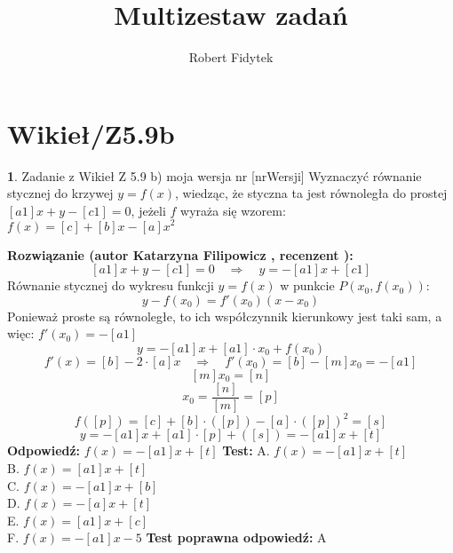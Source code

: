\documentclass[12pt, a4paper]{article}
\title{Multizestaw zadań}
\author{Robert Fidytek}
\date{}
\theoremstyle{definition} %
\newtheorem{zad}{}
\newcommand{\kategoria}[1]{\section{#1}} %
\newcommand{\zadStart}[1]{\begin{zad}#1\newline} %
\newcommand{\zadStop}{\end{zad}}   %
\newcommand{\rozwStart}[2]{\noindent \textbf{Rozwiązanie (autor #1 , recenzent #2): }\newline} %
\newcommand{\rozwStop}{\newline}                                            %
\newcommand{\odpStart}{\noindent \textbf{Odpowiedź:}\newline}    %
\newcommand{\odpStop}{\newline}                                             %
\newcommand{\testStart}{\noindent \textbf{Test:}\newline} %
\newcommand{\testStop}{\newline} %
\newcommand{\kluczStart}{\noindent \textbf{Test poprawna odpowiedź:}\newline} %
\newcommand{\kluczStop}{\newline} %
\begin{document}
\maketitle


\kategoria{Wikieł/Z5.9b}
\zadStart{Zadanie z Wikieł Z 5.9 b) moja wersja nr [nrWersji]}
Wyznaczyć równanie stycznej do krzywej $y=f(x)$, wiedząc, że styczna ta jest równoległa do prostej $[a1]x+y-[c1]=0$, jeżeli $f$ wyraża się wzorem:\\
$f(x)=[c] +[b]x-[a]x^2$
\zadStop
\rozwStart{Katarzyna Filipowicz}{}
$$
[a1]x+y-[c1]=0 \quad \Rightarrow \quad y=-[a1]x+[c1]
$$
Równanie stycznej do wykresu funkcji $y=f(x)$ w punkcie $P(x_0,f(x_0))$:
$$
y-f(x_0)=f'(x_0)(x-x_0)
$$
Ponieważ proste są równoległe, to ich współczynnik kierunkowy jest taki sam, a więc: $f'(x_0)=-[a1]$
$$
y=-[a1]x+[a1]\cdot x_0+f(x_0)
$$ $$
f'(x)=[b]-2\cdot [a]x \quad \Rightarrow \quad f'(x_0)=[b]-[m]x_0=-[a1]
$$ $$
[m]x_0=[n]
$$ $$
x_0=\frac{[n]}{[m]}=[p]
$$ $$
f([p])=[c]+[b]\cdot([p])-[a]\cdot([p])^2=[s]
$$ $$
y=-[a1]x+[a1]\cdot[p]+([s])=-[a1]x +[t]
$$
\rozwStop
\odpStart
$f(x)=-[a1]x+ [t]$
\odpStop
\testStart
A. $f(x)=-[a1]x+ [t]$\\
B. $f(x)=[a1]x+ [t]$\\
C. $f(x)=-[a1]x+[b]$\\
D. $f(x)=-[a]x+ [t]$\\
E. $f(x)=[a1]x+[c]$\\
F. $f(x)=-[a1]x-5$
\testStop
\kluczStart
A
\kluczStop
\end{document}
